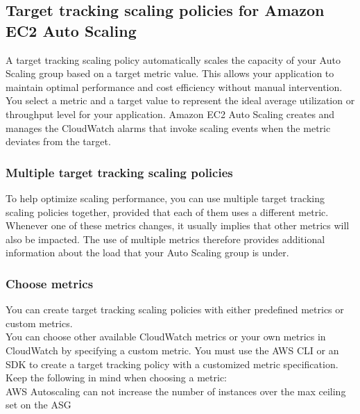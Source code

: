 \documentclass[12pt, letterpaper, twoside]{article}
\begin{document}
\subsection{Target tracking scaling policies for Amazon EC2 Auto Scaling}
A target tracking scaling policy automatically scales the capacity of your Auto Scaling group based on a target metric 
value. This allows your application to maintain optimal performance and cost efficiency without manual intervention.\\
 
You select a metric and a target value to represent the ideal average utilization or throughput level for your 
application. Amazon EC2 Auto Scaling creates and manages the CloudWatch alarms that invoke scaling events when the 
metric deviates from the target.\\

\subsubsection{Multiple target tracking scaling policies}
To help optimize scaling performance, you can use multiple target tracking scaling policies together, provided that 
each of them uses a different metric.\\
Whenever one of these metrics changes, it usually implies that other metrics will also be impacted. The use of multiple 
metrics therefore provides additional information about the load that your Auto Scaling group is under.\\

\subsubsection{Choose metrics}
You can create target tracking scaling policies with either predefined metrics or custom metrics.\\
You can choose other available CloudWatch metrics or your own metrics in CloudWatch by specifying a custom metric. You 
must use the AWS CLI or an SDK to create a target tracking policy with a customized metric specification.\\

Keep the following in mind when choosing a metric:\\

AWS Autoscaling can not increase the number of instances over the max ceiling set on the ASG
\end{document}
